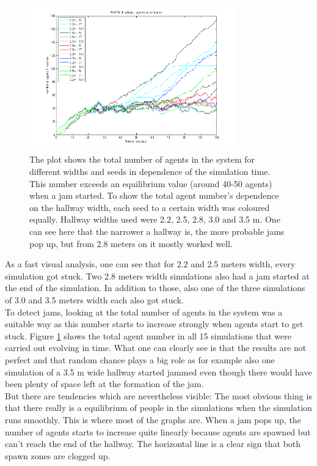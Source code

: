 
\begin{figure}[h!]
	\centering
		\includegraphics[width=0.80\textwidth]{pictures/AallInOne.png}
	\caption{The plot shows the total number of agents in the system for different widths and seeds in dependence of the simulation time. This number exceeds an equilibrium value (around 40-50 agents) when a jam started. To show the total agent number's dependence on the hallway width, each seed to a certain width was coloured equally. Hallway widths used were 2.2, 2.5, 2.8, 3.0 and 3.5 m. One can see here that the narrower a hallway is, the more probable jams pop up, but from 2.8 meters on it mostly worked well.}
	\label{fig:WidthAllInOne}
\end{figure}

\noi As a fast visual analysis, one can see that for 2.2 and 2.5 meters width, every simulation got stuck. Two 2.8 meters width simulations also had a jam started at the end of the simulation. In addition to those, also one of the three simulations of 3.0 and 3.5 meters width each also got stuck.\\

\noi To detect jams, looking at the total number of agents in the system was a suitable way as this number starts to increase strongly when agents start to get stuck. Figure \ref{fig:WidthAllInOne} shows the total agent number in all 15 simulations that were carried out evolving in time. What one can clearly see is that the results are not perfect and that random chance plays a big role as for example also one simulation of a 3.5 m wide hallway started jammed even though there would have been plenty of space left at the formation of the jam.\\
But there are tendencies which are nevertheless visible: The most obvious thing is that there really is a equilibrium of people in the simulations when the simulation runs smoothly. This is where most of the graphs are. When a jam pops up, the number of agents starts to increase quite linearly because agents are spawned but can't reach the end of the hallway. The horizontal line is a clear sign that both spawn zones are clogged up.\\

